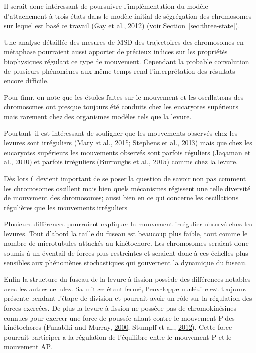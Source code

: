\documentclass[12pt,a4paper,twoside,openright]{book}
\begin{document}
Il serait donc intéressant de poursuivre l'implémentation du modèle
d'attachement à trois états dans le modèle initial de ségrégation des
chromosomes sur lequel est basé ce travail (Gay et al.,
\protect\hyperlink{ref-Gay2012a}{2012}) (voir
Section~\ref{sec:three-state}).

Une analyse détaillée des mesures de MSD des trajectoires des
chromosomes en métaphase pourraient aussi apporter de précieux indices
sur les propriétés biophysiques régulant ce type de mouvement. Cependant
la probable convolution de plusieurs phénomènes aux même temps rend
l'interprétation des résultats encore difficile.

Pour finir, on note que les études faites sur le mouvement et les
oscillations des chromosomes ont presque toujours été conduits chez les
eucaryotes supérieurs mais rarement chez des organismes modèles tels que
la levure.

Pourtant, il est intéressant de souligner que les mouvements observés
chez les levures sont irréguliers (Mary et al.,
\protect\hyperlink{ref-Mary2015}{2015}; Stephens et al.,
\protect\hyperlink{ref-Stephens2013a}{2013}) mais que chez les
eucaryotes supérieurs les mouvements observés sont parfois réguliers
(Jaqaman et al., \protect\hyperlink{ref-Jaqaman2010}{2010}) et parfois
irréguliers (Burroughs et al.,
\protect\hyperlink{ref-Burroughs2015}{2015}) comme chez la levure.

Dès lors il devient important de se poser la question de savoir non pas
comment les chromosomes oscillent mais bien quels mécanismes régissent
une telle diversité de mouvement des chromosomes; aussi bien en ce qui
concerne les oscillations régulières que les mouvements irréguliers.

Plusieurs différences pourraient expliquer le mouvement irrégulier
observé chez les levures. Tout d'abord la taille du fuseau est beaucoup
plus faible, tout comme le nombre de microtubules attachés au
kinétochore. Les chromosomes seraient donc soumis à un éventail de
forces plus restreintes et seraient donc à ces échelles plus sensibles
aux phénomènes stochastiques qui gouvernent la dynamique du fuseau.

Enfin la structure du fuseau de la levure à fission possède des
différences notables avec les autres cellules. Sa mitose étant fermé,
l'enveloppe nucléaire est toujours présente pendant l'étape de division
et pourrait avoir un rôle sur la régulation des forces exercées. De plus
la levure à fission ne possède pas de chromokinésines connues pour
exercer une force de poussée allant contre le mouvement P des
kinétochores (Funabiki and Murray,
\protect\hyperlink{ref-Funabiki2000}{2000}; Stumpff et al.,
\protect\hyperlink{ref-Stumpff2012}{2012}). Cette force pourrait
participer à la régulation de l'équilibre entre le mouvement P et le
mouvement AP.
\end{document}
